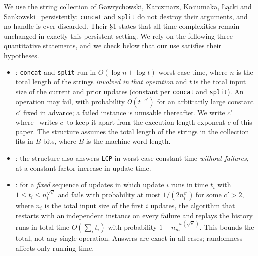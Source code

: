 ﻿\documentclass[11pt]{article}
\theoremstyle{plain}
\theoremstyle{remark}
\begin{document}
We use the string collection of Gawrychowski, Karczmarz, Kociumaka, {\L}\k{a}cki and Sankowski~\cite{GKK} persistently: \texttt{concat} and \texttt{split} do not destroy their arguments, and no handle is ever discarded. Their \S1 states that all time complexities remain unchanged in exactly this persistent setting. We rely on the following three quantitative statements, and we check below that our use satisfies their hypotheses.

\begin{itemize}
\item[(G1)] \cite[Thm.~6.12]{GKK}: \texttt{concat} and \texttt{split} run in $O(\log n+\log t)$ worst-case time, where $n$ is the total length of the strings \emph{involved in that operation} and $t$ is the total input size of the current and prior updates (constant per \texttt{concat} and \texttt{split}). An operation may fail, with probability $O(t^{-c'})$ for an arbitrarily large constant $c'$ fixed in advance; a failed instance is unusable thereafter. We write $c'$ where~\cite{GKK} writes $c$, to keep it apart from the execution-length exponent $c$ of this paper. The structure assumes the total length of the strings in the collection fits in $B$ bits, where $B$ is the machine word length.
\item[(G2)] \cite[Thm.~8.17]{GKK}: the structure also answers \texttt{LCP} in worst-case constant time \emph{without failures}, at a constant-factor increase in update time.
\item[(G3)] \cite[Lem.~A.1]{GKK}: for a \emph{fixed} sequence of updates in which update $i$ runs in time $t_i$ with $1\le t_i\le n_i^{\sqrt{c'}}$ and fails with probability at most $1/(2n_i^{c'})$ for some $c'>2$, where $n_i$ is the total input size of the first $i$ updates, the algorithm that restarts with an independent instance on every failure and replays the history runs in total time $O(\sum_i t_i)$ with probability $1-n_m^{-\omega(\sqrt{c'})}$. This bounds the total, not any single operation. Answers are exact in all cases; randomness affects only running time.
\end{itemize}
\end{document}
